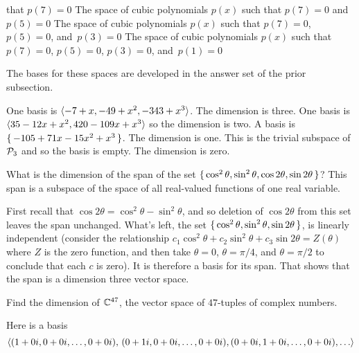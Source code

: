 \begin{exercises}
\begin{exparts}
        that $p(7)=0$
      \partsitem  The space of cubic polynomials $p(x)$ such
        that $p(7)=0$ and~$p(5)=0$
      \partsitem  The space of cubic polynomials $p(x)$ such
        that $p(7)=0$, $p(5)=0$, and~$p(3)=0$
      \partsitem  The space of cubic polynomials $p(x)$ such
        that $p(7)=0$, $p(5)=0$, $p(3)=0$, and~$p(1)=0$
    \end{exparts}
    \begin{answer}
      The bases for these spaces are developed 
      in the answer set of the prior subsection.
      \begin{exparts}
        \partsitem One basis is \( \langle-7+x,-49+x^2,-343+x^3\rangle \).
          The dimension is three.
        \partsitem One basis is $\langle35-12x+x^2,420-109x+x^3\rangle$ so the
          dimension is two.
        \partsitem A basis is $\mbox{$\{\,-105+71x-15x^2+x^3\,\}$}$.
          The dimension is one.
        \partsitem This is the trivial subspace of $\mathcal{P}_3$ and so the 
          basis is empty.
          The dimension is zero.
      \end{exparts}  
    \end{answer}
  \item 
     What is the dimension of the span of the set 
     $\mbox{$\{\,\cos^2\theta,\sin^2\theta,\cos2\theta,\sin2\theta\,\}$}$?
     This span is a subspace of the space of all real-valued functions of 
     one real variable.
     \begin{answer}
       First recall that $\cos2\theta=\cos^2\theta-\sin^2\theta$, and so 
       deletion of $\cos2\theta$ from this set leaves the span unchanged.
       What's left, the set  
       $\mbox{$\{\,\cos^2\theta,\sin^2\theta,\sin2\theta\,\}$}$, is linearly independent
       (consider the relationship
       $c_1\cos^2\theta+c_2\sin^2\theta+c_3\sin2\theta=Z(\theta)$
       where $Z$ is the zero function, and then take
       $\theta=0$, $\theta=\pi/4$, and $\theta=\pi/2$ to conclude that
       each $c$ is zero).
       It is therefore a basis for its span.
       That shows that the span is a dimension three vector space.
     \end{answer}
  \item  
    Find the dimension of \( \mathbb{C}^{47} \), the vector space
    of $47$-tuples of complex numbers.
    \begin{answer}
      Here is a basis
      \begin{equation*}
        \langle(1+0i,0+0i,\dots,0+0i),\,
                  (0+1i,0+0i,\dots,0+0i),(0+0i,1+0i,\dots,0+0i),\ldots \rangle
      \end{equation*}   

\end{answer}
\end{exercises}
